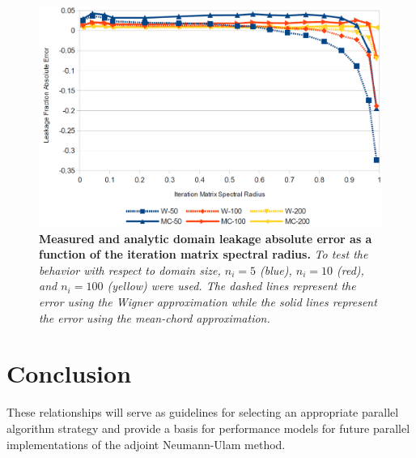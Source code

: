 \documentclass[letterpaper,12pt]{article}
\begin{document}
\begin{figure}[t!]
  \begin{center}
    \includegraphics[width=5in,clip]{leakage_error.png}
  \end{center}
  \caption{\textbf{Measured and analytic domain leakage absolute error
      as a function of the iteration matrix spectral radius.}
    \textit{To test the behavior with respect to domain size, $n_i=5$
      (blue), $n_i=10$ (red), and $n_i=100$ (yellow) were used. The
      dashed lines represent the error using the Wigner approximation
      while the solid lines represent the error using the mean-chord
      approximation.}}
  \label{fig:measured_leakage}
\end{figure}

\section{Conclusion}
These relationships will serve as guidelines for selecting an
appropriate parallel algorithm strategy and provide a basis for
performance models for future parallel implementations of the adjoint
Neumann-Ulam method.

\pagebreak


\end{document}
